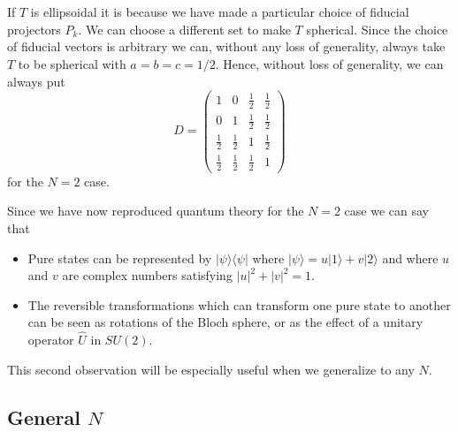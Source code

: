 \documentclass[12pt]{article}
\begin{document}
If $T$ is ellipsoidal it is because we have made a
particular choice of fiducial projectors $\hat{P}_k$.  We can choose a
different set to make $T$ spherical.  Since the choice of fiducial
vectors is arbitrary we can, without any loss of generality, always
take $T$ to be spherical with $a=b=c=1/2$.  Hence, without loss of
generality, we can always put
\begin{equation}\label{Dhalfs}
D= \left( \begin{array}{cccc} 1 &  0 &  \frac{1}{2} & \frac{1}{2}\\[3pt]
                             0 &  1 &   \frac{1}{2}  &  \frac{1}{2} \\[3pt]
                             \frac{1}{2} & \frac{1}{2} &  1 & \frac{1}{2}\\[3pt]
                            \frac{1}{2} & \frac{1}{2} & \frac{1}{2} &  1
                            \end{array} \right)
\end{equation}
for the $N=2$ case.

Since we have now reproduced quantum theory for the $N=2$ case we can
say that
\begin{itemize}
\item Pure states can be represented by $|\psi\rangle\langle\psi |$
where $|\psi\rangle= u|1\rangle+v|2\rangle$ and where $u$ and $v$ are
complex numbers satisfying $|u|^2+|v|^2=1$.
\item The reversible transformations which can transform one pure state
to another can be seen as rotations of the Bloch sphere, or as the
effect of a unitary operator $\hat U$ in $SU(2)$.
\end{itemize}
This second observation will be especially useful when we generalize to
any $N$.

\subsection{General $N$}
\end{document}
